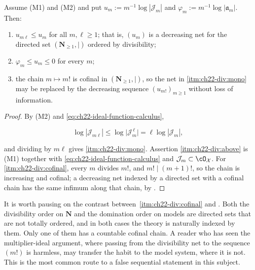 \begin{lemma}
\label{lem:ch22-divisibility-net}
Assume \textup{(M1)} and \textup{(M2)} and put
\(u_m:=m^{-1}\log|\mathcal J_m|\) and
\(\varphi_m:=m^{-1}\log|\mathfrak a_m|\).  Then:
\begin{enumerate}
\item\label{itm:ch22-div:mono} \(u_{m\ell}\leq u_m\) for all
\(m,\ell\geq1\); that is, \((u_m)\) is a decreasing net for the directed set
\((\mathbf N_{\geq1},\mid)\) ordered by divisibility;
\item\label{itm:ch22-div:above} \(\varphi_m\leq u_m\leq0\) for every \(m\);
\item\label{itm:ch22-div:cofinal} the chain \(m\mapsto m!\) is cofinal in
\((\mathbf N_{\geq1},\mid)\), so the net in
\cref{itm:ch22-div:mono} may be replaced by the decreasing sequence
\((u_{m!})_{m\geq1}\) without loss of information.
\end{enumerate}
\end{lemma}

\begin{proof}
By (M2) and \eqref{eq:ch22-ideal-function-calculus},

\[
 \log|\mathcal J_{m\ell}|\leq\log\bigl|\mathcal J_m^{\,\ell}\bigr|
 =\ell\log|\mathcal J_m| ,
\]

and dividing by \(m\ell\) gives \cref{itm:ch22-div:mono}.  Assertion
\cref{itm:ch22-div:above} is (M1) together with
\eqref{eq:ch22-ideal-function-calculus} and
\(\mathcal J_m\subset\cO_{\mathcal X}\).  For
\cref{itm:ch22-div:cofinal}, every \(m\) divides \(m!\), and
\(m!\mid(m+1)!\), so the chain is increasing and cofinal; a decreasing net
indexed by a directed set with a cofinal chain has the same infimum along
that chain, by .
\end{proof}

\begin{remark}
\label{rem:ch22-two-directed-sets}
It is worth pausing on the contrast between
\,\cref{itm:ch22-div:cofinal} and
.  Both the divisibility order on
\(\mathbf N\) and the domination order on models are directed sets that are
not totally ordered, and in both cases the theory is naturally indexed by
them.  Only one of them has a countable cofinal chain.  A reader who has
seen the multiplier-ideal argument, where passing from the divisibility net
to the sequence \((m!)\) is harmless, may transfer the habit to the model
system, where it is not.  This is the most common route to a false
sequential statement in this subject.
\end{remark}

